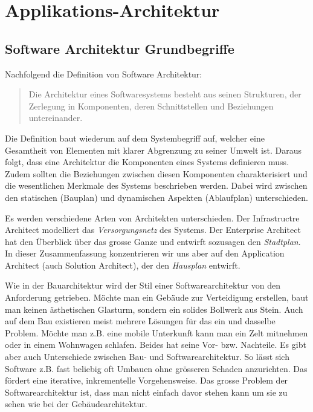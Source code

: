 \chapter{Applikations-Architektur}

\section{Software Architektur Grundbegriffe}

Nachfolgend die Definition von Software Architektur:

\begin{quote}
Die Architektur eines Softwaresystems besteht aus seinen Strukturen, der Zerlegung in Komponenten, deren Schnittstellen und Beziehungen untereinander.
\end{quote}

Die Definition baut wiederum auf dem Systembegriff auf, welcher eine Gesamtheit von Elementen mit klarer Abgrenzung zu seiner Umwelt ist. Daraus folgt, dass eine Architektur die Komponenten eines Systems definieren muss. Zudem sollten die Beziehungen zwischen diesen Komponenten charakterisiert und die wesentlichen Merkmale des Systems beschrieben werden. Dabei wird zwischen den statischen (Bauplan) und dynamischen Aspekten (Ablaufplan) unterschieden.

Es werden verschiedene Arten von Architekten unterschieden. Der Infrastructre Architect modelliert das \textit{Versorgungsnetz} des Systems. Der Enterprise Architect hat den Überblick über das grosse Ganze und entwirft sozusagen den \textit{Stadtplan}. In dieser Zusammenfassung konzentrieren wir uns aber auf den Application Architect (auch Solution Architect), der den \textit{Hausplan} entwirft.

Wie in der Bauarchitektur wird der Stil einer Softwarearchitektur von den Anforderung getrieben. Möchte man ein Gebäude zur Verteidigung erstellen, baut man keinen ästhetischen Glasturm, sondern ein solides Bollwerk aus Stein. Auch auf dem Bau existieren meist mehrere Lösungen für das ein und dasselbe Problem. Möchte man z.B. eine mobile Unterkunft kann man ein Zelt mitnehmen oder in einem Wohnwagen schlafen. Beides hat seine Vor- bzw. Nachteile. Es gibt aber auch Unterschiede zwischen Bau- und Softwarearchitektur. So lässt sich Software z.B. fast beliebig oft Umbauen ohne grösseren Schaden anzurichten. Das fördert eine iterative, inkrementelle Vorgehensweise. Das grosse Problem der Softwarearchitektur ist, dass man nicht einfach davor stehen kann um sie zu sehen wie bei der Gebäudearchitektur.

